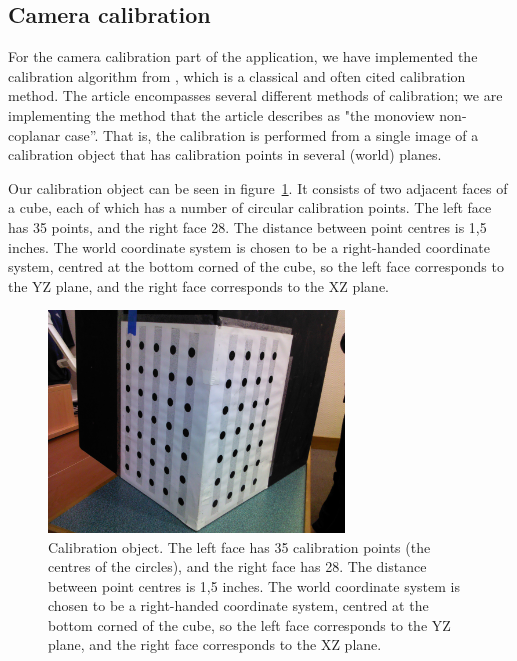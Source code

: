 \subsection{Camera calibration}
\label{sec:calibration}
For the camera calibration part of the application, we have
implemented the calibration algorithm from \cite{TSAI}, which is a
classical and often cited calibration method. The article encompasses
several different methods of calibration; we are implementing the
method that the article describes as "the monoview non-coplanar
case''. That is, the calibration is performed from a single image
of a calibration object that has calibration points in several (world)
planes.

Our calibration object can be seen in figure~\ref{fig:calib-object}.
It consists of two adjacent faces of a cube, each of which has a
number of circular calibration points. The left face has 35 points,
and the right face 28. The distance between point centres is 1,5
inches. The world coordinate system is chosen to be a right-handed
coordinate system, centred at the bottom corned of the cube, so the
left face corresponds to the YZ plane, and the right face corresponds
to the XZ plane.

\begin{figure}[hb]
  \centering
  \includegraphics[width=0.7\textwidth]{figures/calibration-object}
  \caption[Calibration object]{Calibration object. The left face has
    35 calibration points (the centres of the circles), and the right
    face has 28. The distance between point centres is 1,5 inches. The
    world coordinate system is chosen to be a right-handed coordinate
    system, centred at the bottom corned of the cube, so the left face
    corresponds to the YZ plane, and the right face corresponds to the
    XZ plane.}
  \label{fig:calib-object}
\end{figure}

